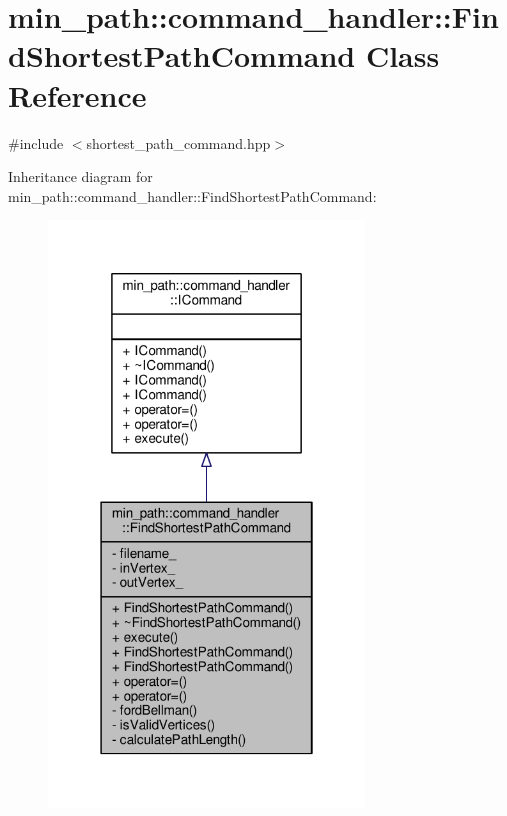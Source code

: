 \hypertarget{a00005}{}\section{min\+\_\+path\+:\+:command\+\_\+handler\+:\+:Find\+Shortest\+Path\+Command Class Reference}
\label{a00005}


{\ttfamily \#include $<$shortest\+\_\+path\+\_\+command.\+hpp$>$}



Inheritance diagram for min\+\_\+path\+:\+:command\+\_\+handler\+:\+:Find\+Shortest\+Path\+Command\+:
\nopagebreak
\begin{figure}[H]
\begin{center}
\leavevmode
\includegraphics[width=238pt]{d6/d2c/a00072}
\end{center}
\end{figure}



